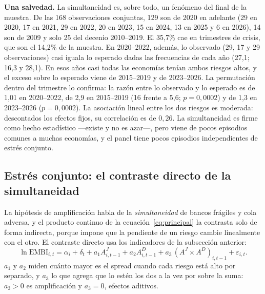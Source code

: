\textbf{Una salvedad.} La simultaneidad es, sobre todo, un fenómeno del final de la muestra. De las 168 observaciones conjuntas, 129 son de 2020 en adelante (29 en 2020, 17 en 2021, 29 en 2022, 20 en 2023, 15 en 2024, 13 en 2025 y 6 en 2026), 14 son de 2009 y solo 25 del decenio 2010--2019. El 35,7\% cae en trimestres de crisis, que son el 14,2\% de la muestra. En 2020--2022, además, lo observado (29, 17 y 29 observaciones) casi iguala lo esperado dadas las frecuencias de cada año (27,1; 16,3 y 28,1). En esos años casi todas las economías tenían ambos riesgos altos, y el exceso sobre lo esperado viene de 2015--2019 y de 2023--2026. La permutación dentro del trimestre lo confirma: la razón entre lo observado y lo esperado es de 1,01 en 2020--2022, de 2,9 en 2015--2019 (16 frente a 5,6; $p=0{,}0002$) y de 1,3 en 2023--2026 ($p=0{,}0002$). La asociación lineal entre los dos riesgos es moderada: descontados los efectos fijos, su correlación es de $0{,}26$. La simultaneidad es firme como hecho estadístico ---existe y no es azar---, pero viene de pocos episodios comunes a muchas economías, y el panel tiene pocos episodios independientes de estrés conjunto.

\subsection{Estrés conjunto: el contraste directo de la simultaneidad}
\label{sec:estres-conjunto}

La hipótesis de amplificación habla de la \emph{simultaneidad} de bancos frágiles y cola adversa, y el producto continuo de la ecuación~\eqref{eq:principal} la contrasta solo de forma indirecta, porque impone que la pendiente de un riesgo cambie linealmente con el otro. El contraste directo usa los indicadores de la subsección anterior:
\begin{equation}
\ln\mathrm{EMBI}_{i,t}=\alpha_i+\delta_t+a_1A^{J}_{i,t-1}+a_2A^{D}_{i,t-1}+a_3\,(A^{J}\times A^{D})_{i,t-1}+\varepsilon_{i,t}.
\label{eq:estres}
\end{equation}
$a_1$ y $a_2$ miden cuánto mayor es el spread cuando cada riesgo está alto por separado, y $a_3$ lo que agrega que lo estén los dos a la vez por sobre la suma: $a_3>0$ es amplificación y $a_3=0$, efectos aditivos.

